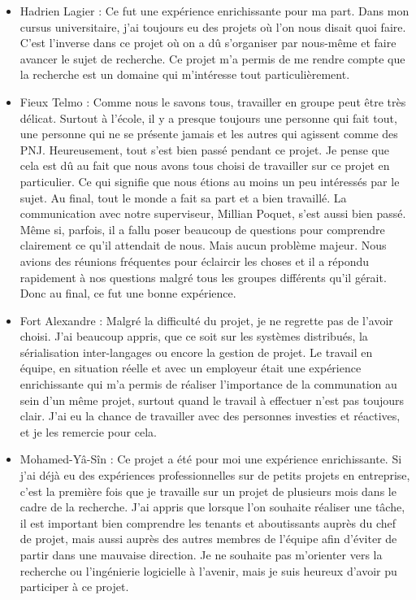 \documentclass{article}
\begin{document}
\begin{itemize}
    \item Hadrien Lagier : Ce fut une expérience enrichissante pour ma part. Dans mon cursus universitaire, j'ai toujours eu des projets où l'on nous disait quoi faire. C'est l'inverse dans ce projet où on a dû s'organiser par nous-même et faire avancer le sujet de recherche. Ce projet m'a permis de me rendre compte que la recherche est un domaine qui m'intéresse tout particulièrement.
    \item Fieux Telmo : Comme nous le savons tous, travailler en groupe peut être très délicat. Surtout à l'école, il y a presque toujours une personne qui fait tout, une personne qui ne se présente jamais et les autres qui agissent comme des PNJ. Heureusement, tout s'est bien passé pendant ce projet. Je pense que cela est dû au fait que nous avons tous choisi de travailler sur ce projet en particulier. Ce qui signifie que nous étions au moins un peu intéressés par le sujet. Au final, tout le monde a fait sa part et a bien travaillé.
    La communication avec notre superviseur, Millian Poquet, s'est aussi bien passé. Même si, parfois, il a fallu poser beaucoup de questions pour comprendre clairement ce qu’il attendait de nous. Mais aucun problème majeur. Nous avions des réunions fréquentes pour éclaircir les choses et il a répondu rapidement à nos questions malgré tous les groupes différents qu'il gérait. Donc au final, ce fut une bonne expérience.
    \item Fort Alexandre : Malgré la difficulté du projet, je ne regrette pas de l'avoir choisi. J'ai beaucoup appris, que ce soit sur les systèmes distribués, la sérialisation inter-langages ou encore la gestion de projet. Le travail en équipe, en situation réelle et avec un employeur était une expérience enrichissante qui m'a permis de réaliser l'importance de la communation au sein d'un même projet, surtout quand le travail à effectuer n'est pas toujours clair. J'ai eu la chance de travailler avec des personnes investies et réactives, et je les remercie pour cela.
    \item Mohamed-Yâ-Sîn : Ce projet a été pour moi une expérience enrichissante. Si j'ai déjà eu des expériences professionnelles sur de petits projets en entreprise, c'est la première fois que je travaille sur un projet de plusieurs mois dans le cadre de la recherche. J'ai appris que lorsque l'on souhaite réaliser une tâche, il est important bien comprendre les tenants et aboutissants auprès du chef de projet, mais aussi auprès des autres membres de l'équipe afin d'éviter de partir dans une mauvaise direction. Je ne souhaite pas m'orienter vers la recherche ou l'ingénierie logicielle à l'avenir, mais je suis heureux d'avoir pu participer à ce projet.

\end{itemize}
\end{document}
